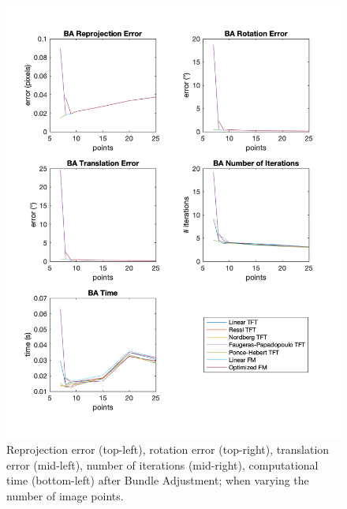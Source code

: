 \begin{figure}[p]
	\centering
	\includegraphics[width=1\textwidth]{Experiments/Synthetic/points/BApointsPlots.png}
	\caption{Reprojection error (top-left), rotation error (top-right), translation error (mid-left), number of iterations (mid-right), computational time (bottom-left) after Bundle Adjustment; when varying the number of image points.}
	\label{fig:BAPointsPlot}
\end{figure}

